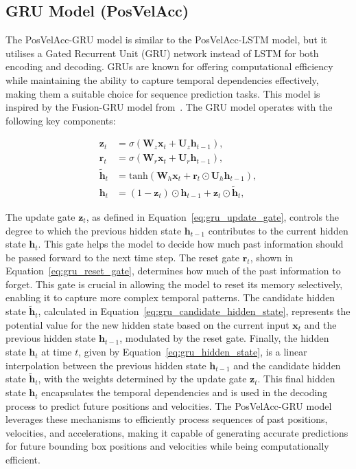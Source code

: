 \documentclass[12pt,oneside]{book} %
\begin{document}
\newpage
\subsection*{GRU Model (PosVelAcc)}
\noindent The PosVelAcc-GRU model is similar to the PosVelAcc-LSTM model, but it utilises a Gated Recurrent Unit (GRU) network instead of LSTM for both encoding and decoding. GRUs are known for offering computational efficiency while maintaining the ability to capture temporal dependencies effectively, making them a suitable choice for sequence prediction tasks. This model is inspired by the Fusion-GRU model from~\citet{FusionGRU}. The GRU model operates with the following key components:

\begin{align}
    \mathbf{z}_t         & = \sigma(\mathbf{W}_z \mathbf{x}_t + \mathbf{U}_z \mathbf{h}_{t-1}), \label{eq:gru_update_gate}                                    \\
    \mathbf{r}_t         & = \sigma(\mathbf{W}_r \mathbf{x}_t + \mathbf{U}_r \mathbf{h}_{t-1}), \label{eq:gru_reset_gate}                                     \\
    \mathbf{\tilde{h}}_t & = \text{tanh}(\mathbf{W}_h \mathbf{x}_t + \mathbf{r}_t \odot \mathbf{U}_h \mathbf{h}_{t-1}), \label{eq:gru_candidate_hidden_state} \\
    \mathbf{h}_t         & = (1 - \mathbf{z}_t) \odot \mathbf{h}_{t-1} + \mathbf{z}_t \odot \mathbf{\tilde{h}}_t, \label{eq:gru_hidden_state}
\end{align}

\noindent The update gate $\mathbf{z}_t$, as defined in Equation~\eqref{eq:gru_update_gate}, controls the degree to which the previous hidden state $\mathbf{h}_{t-1}$ contributes to the current hidden state $\mathbf{h}_t$. This gate helps the model to decide how much past information should be passed forward to the next time step.
The reset gate $\mathbf{r}_t$, shown in Equation~\eqref{eq:gru_reset_gate}, determines how much of the past information to forget. This gate is crucial in allowing the model to reset its memory selectively, enabling it to capture more complex temporal patterns.
The candidate hidden state $\mathbf{\tilde{h}}_t$, calculated in Equation~\eqref{eq:gru_candidate_hidden_state}, represents the potential value for the new hidden state based on the current input $\mathbf{x}_t$ and the previous hidden state $\mathbf{h}_{t-1}$, modulated by the reset gate.
Finally, the hidden state $\mathbf{h}_t$ at time $t$, given by Equation~\eqref{eq:gru_hidden_state}, is a linear interpolation between the previous hidden state $\mathbf{h}_{t-1}$ and the candidate hidden state $\mathbf{\tilde{h}}_t$, with the weights determined by the update gate $\mathbf{z}_t$. This final hidden state $\mathbf{h}_t$ encapsulates the temporal dependencies and is used in the decoding process to predict future positions and velocities.
The PosVelAcc-GRU model leverages these mechanisms to efficiently process sequences of past positions, velocities, and accelerations, making it capable of generating accurate predictions for future bounding box positions and velocities while being computationally efficient.
\end{document}
